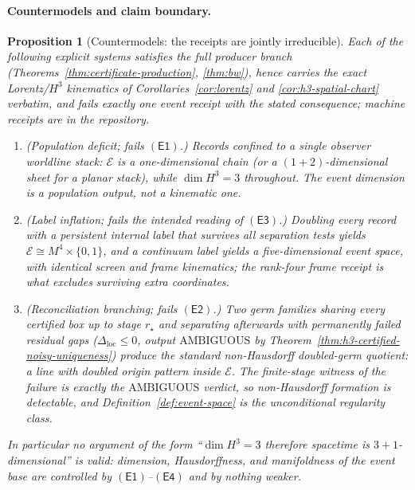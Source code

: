 \documentclass[11pt]{article}
\newtheorem{proposition}[theorem]{Proposition}
\begin{document}
\paragraph{Countermodels and claim boundary.}

\begin{proposition}[Countermodels: the receipts are jointly irreducible]
\label{prop:event-countermodels}
Each of the following explicit systems satisfies the full producer branch
(Theorems~\ref{thm:certificate-production}, \ref{thm:bw}), hence carries the
exact Lorentz/\(H^3\) kinematics of Corollaries~\ref{cor:lorentz} and
\ref{cor:h3-spatial-chart} verbatim, and fails exactly one event receipt with
the stated consequence; machine receipts are in the repository.
\begin{enumerate}[leftmargin=2em]
\item (\emph{Population deficit; fails \(\mathsf{(E1)}\).}) Records confined
to a single observer worldline stack: \(\mathcal E\) is a one-dimensional
chain (or a \((1{+}2)\)-dimensional sheet for a planar stack), while
\(\dim H^3=3\) throughout. The event dimension is a population output, not a
kinematic one.
\item (\emph{Label inflation; fails the intended reading of
\(\mathsf{(E3)}\).}) Doubling every record with a persistent internal label
that survives all separation tests yields
\(\mathcal E\cong M^4\times\{0,1\}\), and a continuum label yields a
five-dimensional event space, with identical screen and frame kinematics; the
rank-four frame receipt is what excludes surviving extra coordinates.
\item (\emph{Reconciliation branching; fails \(\mathsf{(E2)}\).}) Two germ
families sharing every certified box up to stage \(r_\star\) and separating
afterwards with permanently failed residual gaps
(\(\Delta_{\mathrm{loc}}\leq0\), output \(\mathrm{AMBIGUOUS}\) by
Theorem~\ref{thm:h3-certified-noisy-uniqueness}) produce the standard
non-Hausdorff doubled-germ quotient: a line with doubled origin pattern
inside \(\mathcal E\). The finite-stage witness of the failure is exactly the
\(\mathrm{AMBIGUOUS}\) verdict, so non-Hausdorff formation is detectable, and
Definition~\ref{def:event-space} is the unconditional regularity class.
\end{enumerate}
In particular no argument of the form ``\(\dim H^3=3\) therefore spacetime is
\(3{+}1\)-dimensional'' is valid: dimension, Hausdorffness, and manifoldness
of the event base are controlled by \(\mathsf{(E1)}\)--\(\mathsf{(E4)}\) and
by nothing weaker.
\end{proposition}
\end{document}
